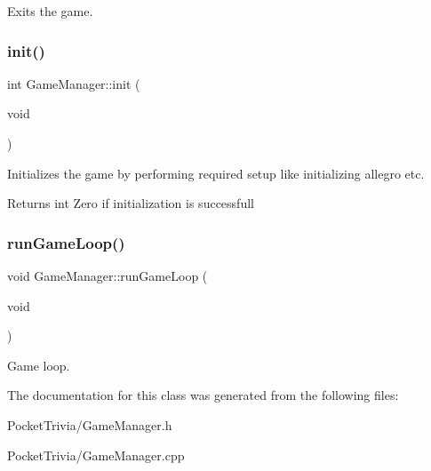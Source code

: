 Exits the game. 

\mbox{\label{class_game_manager_a0b2f746268718b7fccc05c178217fcff}} 
\subsubsection{\texorpdfstring{init()}{init()}}
{\footnotesize\ttfamily int Game\+Manager\+::init (\begin{DoxyParamCaption}\item[{void}]{ }\end{DoxyParamCaption})}



Initializes the game by performing required setup like initializing allegro etc. 

\begin{DoxyReturn}{Returns}
int Zero if initialization is successfull 
\end{DoxyReturn}
\mbox{\label{class_game_manager_a7a840d42c2e52b2f827800bbac51c944}} 
\subsubsection{\texorpdfstring{runGameLoop()}{runGameLoop()}}
{\footnotesize\ttfamily void Game\+Manager\+::run\+Game\+Loop (\begin{DoxyParamCaption}\item[{void}]{ }\end{DoxyParamCaption})}



Game loop. 



The documentation for this class was generated from the following files\+:\begin{DoxyCompactItemize}
\item 
Pocket\+Trivia/Game\+Manager.\+h\item 
Pocket\+Trivia/Game\+Manager.\+cpp\end{DoxyCompactItemize}
